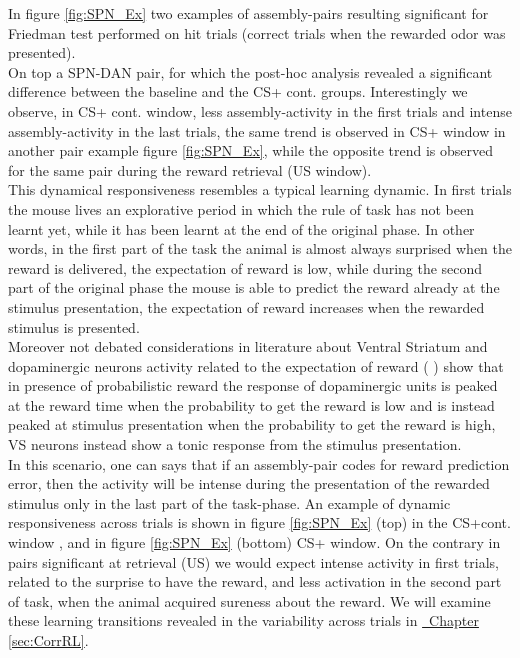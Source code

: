 In figure \ref{fig:SPN_Ex} two examples of assembly-pairs resulting significant for Friedman test performed on hit trials (correct trials when the rewarded odor was presented).\\On top a SPN-DAN pair, for which the post-hoc analysis revealed a significant difference between the baseline and the CS+ cont. groups. Interestingly we observe, in CS+ cont. window, less assembly-activity in the first trials and intense assembly-activity in the last trials, the same trend is observed in CS+ window in another pair example figure \ref{fig:SPN_Ex}, while the opposite trend is observed for the same pair during the reward retrieval (US window).\\This dynamical responsiveness resembles a typical learning dynamic. In first trials the mouse lives an explorative period in which the rule of task has not been learnt yet, while it has been learnt at the end of the original phase. In other words, in the first part of the task the animal is almost always surprised when the reward is delivered, the expectation of reward is low, while during the second part of the original phase the mouse is able to predict the reward already at the stimulus presentation, the expectation of reward increases when the rewarded stimulus is presented.\\Moreover not debated considerations in literature about Ventral Striatum and dopaminergic neurons activity related to the expectation of reward (\cite{Schultz1992} \cite{Schultz} \cite{Fiorillo}) show that in presence of probabilistic reward the response of dopaminergic units is peaked at the reward time when the probability to get the reward is low and is instead peaked at stimulus presentation when the probability to get the reward is high, VS neurons instead show a tonic response from the stimulus presentation.\\In this scenario, one can says that if an assembly-pair codes for reward prediction error, then the activity will be intense during the presentation of the rewarded stimulus only in the last part of the task-phase. An example of dynamic responsiveness across trials is shown in figure \ref{fig:SPN_Ex} (top) in the CS+cont. window , and in figure \ref{fig:SPN_Ex} (bottom) CS+ window. On the contrary in pairs significant at retrieval (US) we would expect intense activity in first trials, related to the surprise to have the reward, and less activation in the second part of task, when the animal acquired sureness about the reward. We will examine these learning transitions revealed in the variability across trials in \hyperref[sec:CorrRL]{~Chapter \ref*{sec:CorrRL}}.\\
